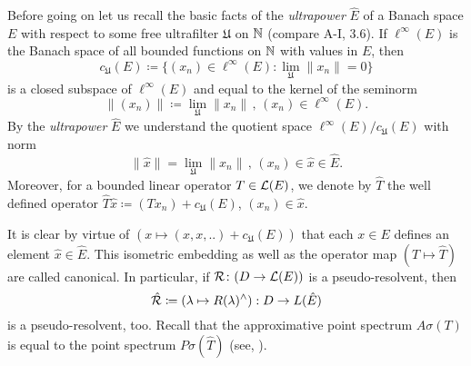 Before going on let us recall the basic facts of the \emph{ultrapower} $\hat{E}$ of a Banach space $E$ with respect to some free ultrafilter $\mathfrak{U}$ on $\mathbb{N} $ (compare A-I, 3.6).
If $\ell^{\infty}(E)$ is the Banach space of all bounded functions on $\mathbb{N} $ with values in $E$, then
\[
c_{\mathfrak{U}}(E) \coloneqq \{(x_{n}) \in \ell^{\infty}(E) \colon \lim_{\mathfrak{U}}\|x_{n}\| = 0\}
\]
is a closed subspace of $\ell^{\infty}(E)$ and equal to the kernel of the seminorm
\[
\|(x_{n})\| \coloneqq \lim_{\mathfrak{U}}\|x_{n}\| \, , \, (x_{n}) \in \ell^{\infty}(E).
\]
By the \emph{ultrapower} $\hat{E}$ we understand the quotient space $\ell^{\infty}(E)/c_{\mathfrak{U}}(E)$ with norm
\[
\|\hat{x}\| = \lim_{\mathfrak{U}}\|x_{n}\| \, , \, (x_{n}) \in \hat{x} \in \hat{E}.
\]
Moreover, for a bounded linear operator $T \in \mathcal{L}(E)$, we denote by $\hat{T}$ the well defined operator $\hat{T}\hat{x} \coloneqq (Tx_{n}) + c_{\mathfrak{U}}(E)$, $(x_{n}) \in \hat{x}$.

It is clear by virtue of $(x \mapsto (x, x, ..) + c_{\mathfrak{U}}(E))$ that each $x \in E$ defines an element $\hat{x} \in \hat{E}$.
This isometric embedding as well as the operator map $(T \mapsto \hat{T})$ are called canonical.
In particular, if $\mathcal{R} \colon (D \to \mathcal{L}(E))$ is a pseudo-resolvent, then
\[
\hat{\mathcal{R}} \coloneqq (\lambda \mapsto R(\lambda)^{\wedge}): D \to L(\hat{E})
\]
is a pseudo-resolvent, too.
Recall that the approximative point spectrum $A{\sigma}(T)$ is equal to the point spectrum $P{\sigma}(\hat{T})$ (see, \eg \citet[Chapter V, §1]{schaefer:1974}).

